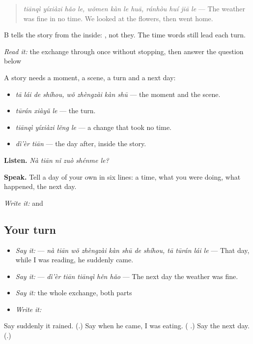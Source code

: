 \begin{quote}
\emph{tiānqì yíxiàzi hǎo le, wǒmen kàn le huā, ránhòu huí jiā le} — The weather was fine in no time. We looked at the flowers, then went home.
\end{quote}

B tells the story from the inside: , not they. The time words still lead each turn.

\begin{tcolorbox}[breakable,skin=enhanced,colback=orange!6,colframe=orange!45!black,boxrule=0.5pt,arc=1mm,left=6pt,right=6pt,top=4pt,bottom=4pt,fonttitle=\bfseries,title={Read this}]
\emph{Read it:} the exchange through once without stopping, then answer the question below
\end{tcolorbox}

\begin{grammarlens}[title={What you've built — telling a day}]
A story needs a moment, a scene, a turn and a next day:

\begin{itemize}
\raggedright
  \item \textbf{ } \emph{tā lái de shíhou, wǒ zhèngzài kàn shū} — the moment and the scene.
  \item \textbf{} \emph{tūrán xiàyǔ le} — the turn.
  \item \textbf{} \emph{tiānqì yíxiàzi lěng le} — a change that took no time.
  \item \textbf{} \emph{dì'èr tiān} — the day after, inside the story.
\end{itemize}

\textbf{Listen.} \emph{Nà tiān nǐ zuò shénme le?}

\textbf{Speak.} Tell a day of your own in six lines: a time, what you were doing, what happened, the next day.

\emph{Write it:}  and 
\end{grammarlens}

\subsection*{Your turn}
\begin{itemize}
\raggedright
  \item \emph{Say it:}   — \emph{nà tiān wǒ zhèngzài kàn shū de shíhou, tā tūrán lái le} — That day, while I was reading, he suddenly came.
  \item \emph{Say it:}  — \emph{dì'èr tiān tiānqì hěn hǎo} — The next day the weather was fine.
  \item \emph{Say it:} the whole exchange, both parts
  \item \emph{Write it:} 
\end{itemize}

\begin{tcolorbox}[breakable,colback=teal!4,colframe=teal!35!black,title={Before you move on}]
Say suddenly it rained. (\textbf{}.) Say when he came, I was eating. (\textbf{ }.) Say the next day. (\textbf{}.)
\end{tcolorbox}
